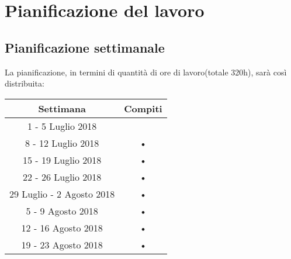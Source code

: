 \newpage
\section*{Pianificazione del lavoro}

\subsection*{Pianificazione settimanale}




La pianificazione, in termini di quantità di ore di lavoro(totale 320h), sarà così distribuita:


\begin{center}
\begin{tabular}{|c|c|}
\hline 
\textbf{Settimana} & \textbf{Compiti} \\ 
\hline 
1 - 5 Luglio 2018&

 \\ 
\hline 
8 - 12 Luglio 2018 & • \\ 
\hline 
15 - 19 Luglio 2018 & • \\ 
\hline 
22 - 26 Luglio 2018 & • \\ 
\hline 
29 Luglio -  2 Agosto 2018 & • \\ 
\hline 
5 - 9 Agosto 2018 & • \\ 
\hline 
12 - 16 Agosto 2018 & • \\ 
\hline 
19 - 23 Agosto 2018 & • \\ 
\hline 
\end{tabular} 
    
\end{center}

\newpage